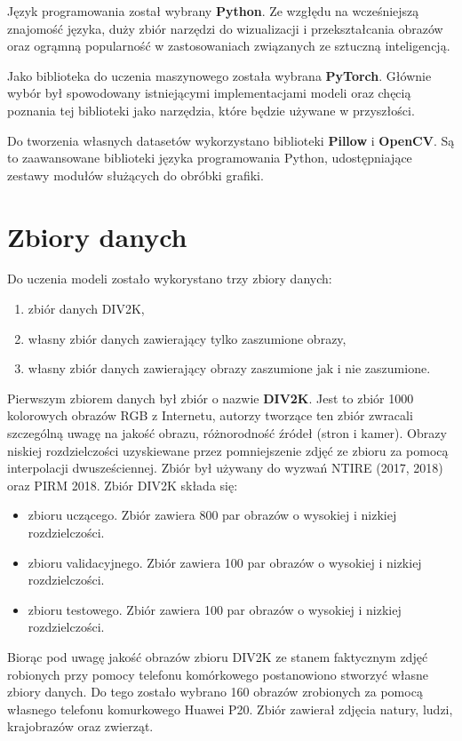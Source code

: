 \documentclass[a4paper,12pt,twoside,openany]{report}
\begin{document}
Język programowania został wybrany \textbf{Python}. Ze wzgłędu na wcześniejszą znajomość języka, duży  zbiór narzędzi do wizualizacji i przekształcania obrazów oraz  ogrąmną popularność w zastosowaniach związanych ze sztuczną inteligencją.

Jako biblioteka do uczenia maszynowego została wybrana \textbf{PyTorch}. Głównie wybór był spowodowany istniejącymi implementacjami modeli oraz chęcią poznania tej biblioteki jako narzędzia, które będzie używane w przyszłości.

Do tworzenia własnych datasetów wykorzystano biblioteki \textbf{Pillow} i \textbf{OpenCV}. Są to zaawansowane biblioteki języka programowania Python, udostępniające zestawy modułów służących do obróbki grafiki.


\section{Zbiory danych}
\label{Zbior danych}
Do uczenia modeli zostało wykorystano trzy zbiory danych:
\begin{enumerate}
	\item zbiór  danych DIV2K,
	\item własny zbiór danych zawierający tylko  zaszumione obrazy,
	\item własny zbiór danych zawierający obrazy zaszumione jak i nie zaszumione.
\end{enumerate}

Pierwszym zbiorem danych był  zbiór o nazwie \textbf{DIV2K}. Jest to zbiór 1000 kolorowych obrazów RGB z Internetu, autorzy tworzące ten zbiór zwracali szczególną uwagę na jakość obrazu, różnorodność źródeł (stron i kamer). Obrazy niskiej rozdzielczości uzyskiewane przez pomniejszenie zdjęć ze zbioru za pomocą interpolacji dwusześciennej. Zbiór był używany do wyzwań NTIRE (2017, 2018) oraz PIRM 2018. Zbiór DIV2K składa się: 
\begin{itemize}
	\item zbioru uczącego. Zbiór zawiera 800 par obrazów  o  wysokiej  i nizkiej  rozdzielczości.
	\item zbioru validacyjnego.  Zbiór zawiera 100 par obrazów  o  wysokiej  i nizkiej  rozdzielczości.
	\item zbioru testowego. Zbiór zawiera 100 par obrazów  o  wysokiej  i nizkiej  rozdzielczości.
\end{itemize}

Biorąc pod uwagę jakość obrazów zbioru DIV2K ze stanem faktycznym zdjęć robionych przy pomocy telefonu komórkowego postanowiono stworzyć własne zbiory danych. Do tego zostało wybrano 160 obrazów zrobionych za pomocą własnego telefonu komurkowego Huawei P20. Zbiór zawierał zdjęcia natury, ludzi, krajobrazów oraz zwierząt.
\end{document}
